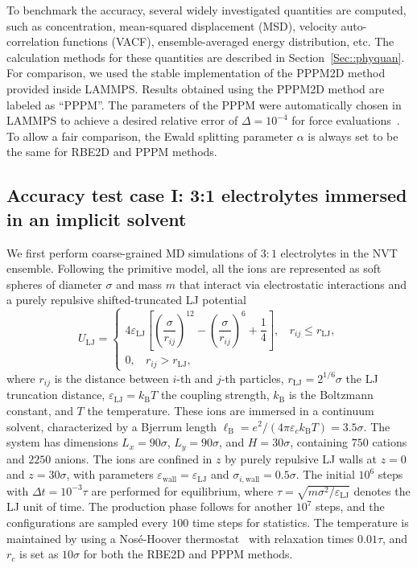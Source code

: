 To benchmark the accuracy, several widely investigated quantities are computed, such as concentration, mean-squared displacement (MSD), velocity auto-correlation functions (VACF), ensemble-averaged energy distribution, etc. 
The calculation methods for these quantities are described in Section~\ref{Sec::phyquan}.
For comparison, we used the stable implementation of the PPPM2D method~\cite{crozier2001molecular} provided inside LAMMPS. 
Results obtained using the PPPM2D method are labeled as ``PPPM''. 
The parameters of the PPPM were automatically chosen in LAMMPS to achieve a desired relative error of $\Delta=10^{-4}$ for force evaluations~\cite{deserno1998mesh}. 
  {To allow a fair comparison}, the Ewald splitting parameter $\alpha$ is always set to be the same for RBE2D and PPPM methods.

\subsection{Accuracy test case I: 3:1 electrolytes immersed in an implicit solvent}\label{subsec::electrolyte-neutral}
We first perform coarse-grained MD simulations of $3:1$ electrolytes in the NVT ensemble. 
Following the primitive model, all the ions are represented as soft spheres of diameter $\sigma$ and mass $m$ that interact via  {electrostatic interactions} and a purely repulsive shifted-truncated LJ potential
\begin{equation}
	U_{\text{LJ}}=\begin{cases}
		4\varepsilon_{\text{LJ}}\left[\left(\dfrac{\sigma}{r_{ij}}\right)^{12}-\left(\dfrac{\sigma}{r_{ij}}\right)^6+\dfrac{1}{4}\right],~~~~r_{ij}\leq r_{\text{LJ}},\\
		0,~~~~r_{ij}>r_{\text{LJ}},	
	\end{cases}
\end{equation}
where $r_{ij}$ is the distance between $i$-th and $j$-th particles, $r_{\text{LJ}}=2^{1/6}\sigma$ the LJ truncation distance, $\varepsilon_{\text{LJ}}=k_{\text{B}}T$ the coupling strength, $k_{\text{B}}$ is the Boltzmann constant, and $T$ the temperature. These ions are immersed in a continuum solvent, characterized by a Bjerrum length 
$\ell_{\text{B}}=e^2/(4\pi \varepsilon_c k_{\text{B}}T)=3.5\sigma$. The system has dimensions $L_x=90\sigma$, $L_y=90\sigma$, and $H=30\sigma$, containing $750$ cations and $2250$ anions. The ions are confined in $z$ by purely repulsive LJ walls at $z=0$ and $z=30\sigma$, with parameters $\varepsilon_{\text{wall}}=\varepsilon_{\text{LJ}}$ and $\sigma_{i,\text{wall}}=0.5\sigma$. 
The initial $10^6$ steps with $\Delta t=10^{-3}\tau$ are performed for equilibrium, where $\tau=\sqrt{m\sigma^2/\varepsilon_{\text{LJ}}}$ denotes the LJ unit of time. The production phase follows for another $10^7$ steps, and the configurations are sampled every $100$ time steps for statistics. 
The temperature is maintained by using a Nos\'e-Hoover thermostat~\cite{hoover1985canonical} with relaxation times $0.01\tau$, %
and $r_c$ is set as $10\sigma$ for both the RBE2D and PPPM methods.  

